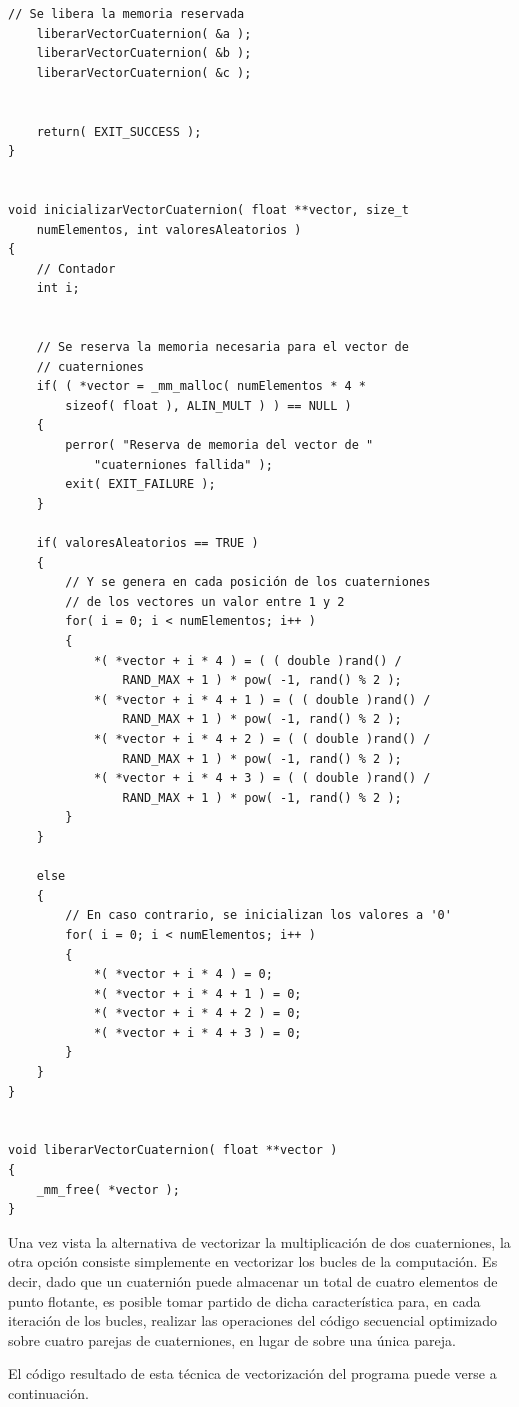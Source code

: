 \documentclass[conference]{IEEEtran}
\begin{document}
\begin{lstlisting}[style=CStyle, title=Código con la multiplicación vectorizada.]
    // Se libera la memoria reservada
    liberarVectorCuaternion( &a );
    liberarVectorCuaternion( &b );
    liberarVectorCuaternion( &c );


    return( EXIT_SUCCESS );
}


void inicializarVectorCuaternion( float **vector, size_t
    numElementos, int valoresAleatorios )
{
    // Contador
    int i;


    // Se reserva la memoria necesaria para el vector de
    // cuaterniones
    if( ( *vector = _mm_malloc( numElementos * 4 *
        sizeof( float ), ALIN_MULT ) ) == NULL )
    {
        perror( "Reserva de memoria del vector de "
            "cuaterniones fallida" );
        exit( EXIT_FAILURE );
    }

    if( valoresAleatorios == TRUE )
    {
        // Y se genera en cada posición de los cuaterniones
        // de los vectores un valor entre 1 y 2
        for( i = 0; i < numElementos; i++ )
        {
            *( *vector + i * 4 ) = ( ( double )rand() /
                RAND_MAX + 1 ) * pow( -1, rand() % 2 );
            *( *vector + i * 4 + 1 ) = ( ( double )rand() /
                RAND_MAX + 1 ) * pow( -1, rand() % 2 );
            *( *vector + i * 4 + 2 ) = ( ( double )rand() /
                RAND_MAX + 1 ) * pow( -1, rand() % 2 );
            *( *vector + i * 4 + 3 ) = ( ( double )rand() /
                RAND_MAX + 1 ) * pow( -1, rand() % 2 );
        }
    }

    else
    {
        // En caso contrario, se inicializan los valores a '0'
        for( i = 0; i < numElementos; i++ )
        {
            *( *vector + i * 4 ) = 0;
            *( *vector + i * 4 + 1 ) = 0;
            *( *vector + i * 4 + 2 ) = 0;
            *( *vector + i * 4 + 3 ) = 0;
        }
    }
}


void liberarVectorCuaternion( float **vector )
{
    _mm_free( *vector );
}
\end{lstlisting}

Una vez vista la alternativa de vectorizar la multiplicación de dos cuaterniones, la otra opción consiste simplemente en vectorizar los bucles de la computación. Es decir, dado que un cuaternión puede almacenar un total de cuatro elementos de punto flotante, es posible tomar partido de dicha característica para, en cada iteración de los bucles, realizar las operaciones del código secuencial optimizado sobre cuatro parejas de cuaterniones, en lugar de sobre una única pareja.

El código resultado de esta técnica de vectorización del programa puede verse a continuación.
\end{document}
